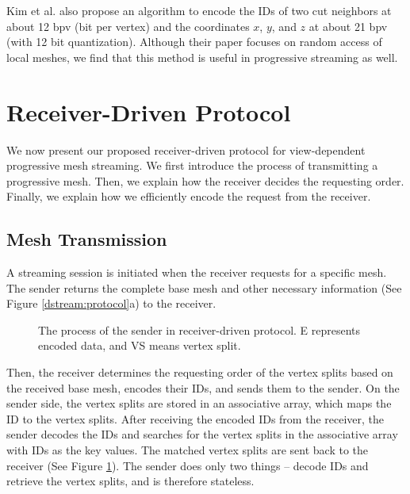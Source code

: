     Kim et al. \cite{multiresolution:kim} also propose an algorithm
    to encode the IDs of two cut neighbors at about 12 bpv (bit per vertex) 
    and the coordinates $x$, $y$, and $z$ at about 21 bpv (with 12 bit quantization).
    Although their paper focuses on random access of local meshes, we find that this 
	method is useful in progressive streaming as well. 

\section{Receiver-Driven Protocol}
     \label{s:dstream:protocol}
	 We now present our proposed receiver-driven protocol
     for view-dependent progressive mesh streaming.
     We first introduce the process of transmitting 
     a progressive mesh. Then, we explain how the receiver decides the requesting order.
     Finally, we explain how we efficiently encode the request from the receiver.
     
     \subsection{Mesh Transmission} 
     A streaming session is initiated when the receiver requests for a specific
     mesh.
     The sender returns the complete base mesh and other necessary information
     (See Figure \ref{dstream:protocol}a) to the receiver.
     
     \begin{figure}
     \centering
     \caption{The process of the sender in receiver-driven protocol. 
     E represents encoded data, and VS means vertex split. \label{dstream:process}}
     \end{figure}
     Then, the receiver determines
     the requesting order of the vertex splits based on the received base mesh, 
     encodes their IDs, and
     sends them to the sender. On the sender side, the vertex splits are stored
     in an associative array, which maps the ID to the vertex splits. 
     After receiving the encoded IDs from the receiver, 
     the sender decodes the IDs and searches for the vertex splits 
     in the associative array
     with IDs as the key values. The matched vertex splits
     are sent back to the receiver (See Figure \ref{dstream:process}). 
     The sender does only two things -- decode IDs and retrieve the 
     vertex splits, and is therefore stateless. 
